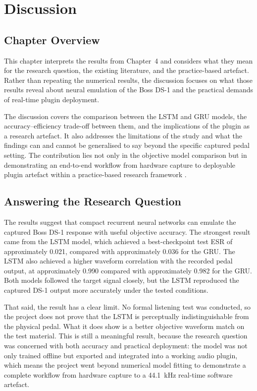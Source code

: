 \chapter{Discussion}
\label{chap:discussion}

\section{Chapter Overview}

This chapter interprets the results from Chapter~4 and considers what they mean for the research question, the existing literature, and the practice-based artefact. Rather than repeating the numerical results, the discussion focuses on what those results reveal about neural emulation of the Boss DS-1 and the practical demands of real-time plugin deployment.

The discussion covers the comparison between the LSTM and GRU models, the accuracy--efficiency trade-off between them, and the implications of the plugin as a research artefact. It also addresses the limitations of the study and what the findings can and cannot be generalised to say beyond the specific captured pedal setting. The contribution lies not only in the objective model comparison but in demonstrating an end-to-end workflow from hardware capture to deployable plugin artefact within a practice-based research framework \cite{candy_practice-based_2018,batty_research_2024}.

\section{Answering the Research Question}

The results suggest that compact recurrent neural networks can emulate the captured Boss DS-1 response with useful objective accuracy. The strongest result came from the LSTM model, which achieved a best-checkpoint test ESR of approximately 0.021, compared with approximately 0.036 for the GRU. The LSTM also achieved a higher waveform correlation with the recorded pedal output, at approximately 0.990 compared with approximately 0.982 for the GRU. Both models followed the target signal closely, but the LSTM reproduced the captured DS-1 output more accurately under the tested conditions.

That said, the result has a clear limit. No formal listening test was conducted, so the project does not prove that the LSTM is perceptually indistinguishable from the physical pedal. What it does show is a better objective waveform match on the test material. This is still a meaningful result, because the research question was concerned with both accuracy and practical deployment: the model was not only trained offline but exported and integrated into a working audio plugin, which means the project went beyond numerical model fitting to demonstrate a complete workflow from hardware capture to a 44.1~kHz real-time software artefact.

